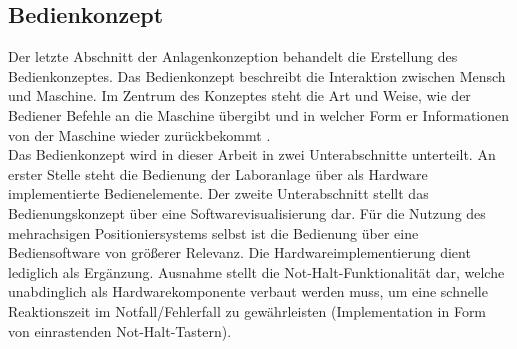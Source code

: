 \documentclass[../../../Bachelorarbeit.tex]{subfiles}
\begin{document}
\subsection{Bedienkonzept}
Der letzte Abschnitt der Anlagenkonzeption behandelt die Erstellung des Bedienkonzeptes. Das Bedienkonzept beschreibt die Interaktion zwischen Mensch und Maschine. Im Zentrum des Konzeptes steht die Art und Weise, wie der Bediener Befehle an die Maschine übergibt und in welcher Form er Informationen von der Maschine wieder zurückbekommt \cite[170]{Wietzke2012}. \\
Das Bedienkonzept wird in dieser Arbeit in zwei Unterabschnitte unterteilt. An erster Stelle steht die Bedienung der Laboranlage über als Hardware implementierte Bedienelemente. Der zweite Unterabschnitt stellt das Bedienungskonzept über eine Softwarevisualisierung dar. Für die Nutzung des mehrachsigen Positioniersystems selbst ist die Bedienung über eine Bediensoftware von größerer Relevanz. Die Hardwareimplementierung dient lediglich als Ergänzung. Ausnahme stellt die Not-Halt-Funktionalität dar, welche unabdinglich als Hardwarekomponente verbaut werden muss, um eine schnelle Reaktionszeit im Notfall/Fehlerfall zu gewährleisten (Implementation in Form von einrastenden Not-Halt-Tastern).
\end{document}
